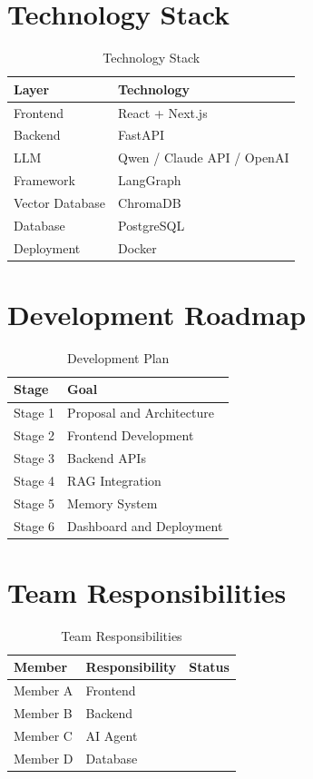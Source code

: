 \documentclass[11pt]{article}
\begin{document}
\section{Technology Stack}

\begin{table}[h]
\centering
\begin{tabular}{ll}
\toprule
Layer & Technology\\
\midrule
Frontend & React + Next.js\\
Backend & FastAPI\\
LLM & Qwen / Claude API / OpenAI\\
Framework & LangGraph\\
Vector Database & ChromaDB\\
Database & PostgreSQL\\
Deployment & Docker\\
\bottomrule
\end{tabular}
\caption{Technology Stack}
\end{table}

\section{Development Roadmap}

\begin{table}[h]
\centering
\begin{tabular}{ll}
\toprule
Stage & Goal\\
\midrule
Stage 1 & Proposal and Architecture\\
Stage 2 & Frontend Development\\
Stage 3 & Backend APIs\\
Stage 4 & RAG Integration\\
Stage 5 & Memory System\\
Stage 6 & Dashboard and Deployment\\
\bottomrule
\end{tabular}
\caption{Development Plan}
\end{table}

\section{Team Responsibilities}

\begin{table}[h]
\centering
\begin{tabular}{lll}
\toprule
Member & Responsibility & Status\\
\midrule
Member A & Frontend & \\
Member B & Backend & \\
Member C & AI Agent & \\
Member D & Database & \\
\bottomrule
\end{tabular}
\caption{Team Responsibilities}
\end{table}
\end{document}
